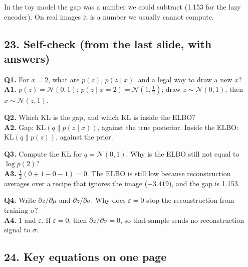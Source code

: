In the toy model the gap was a number we could subtract (1.153 for the lazy encoder). On real images it is a number we usually cannot compute.

\subsection*{23. Self-check (from the last slide, with answers)}

\textbf{Q1.} For $x = 2$, what are $p(z)$, $p(z \mid x)$, and a legal way to draw a new $x$?\\
\textbf{A1.} $p(z) = \mathcal{N}(0,1)$; $p(z \mid x = 2) = \mathcal{N}(1, \tfrac12)$; draw $z \sim \mathcal{N}(0,1)$, then $x \sim \mathcal{N}(z, 1)$.

\textbf{Q2.} Which KL is the gap, and which KL is inside the ELBO?\\
\textbf{A2.} Gap: $\mathrm{KL}(q \| p(z \mid x))$, against the true posterior. Inside the ELBO: $\mathrm{KL}(q \| p(z))$, against the prior.

\textbf{Q3.} Compute the KL for $q = \mathcal{N}(0,1)$. Why is the ELBO still not equal to $\log p(2)$?\\
\textbf{A3.} $\tfrac12(0 + 1 - 0 - 1) = 0$. The ELBO is still low because reconstruction averages over a recipe that ignores the image ($-3.419$), and the gap is 1.153.

\textbf{Q4.} Write $\partial z/\partial\mu$ and $\partial z/\partial\sigma$. Why does $\varepsilon = 0$ stop the reconstruction from training $\sigma$?\\
\textbf{A4.} 1 and $\varepsilon$. If $\varepsilon = 0$, then $\partial z/\partial\sigma = 0$, so that sample sends no reconstruction signal to $\sigma$.

\subsection*{24. Key equations on one page}

